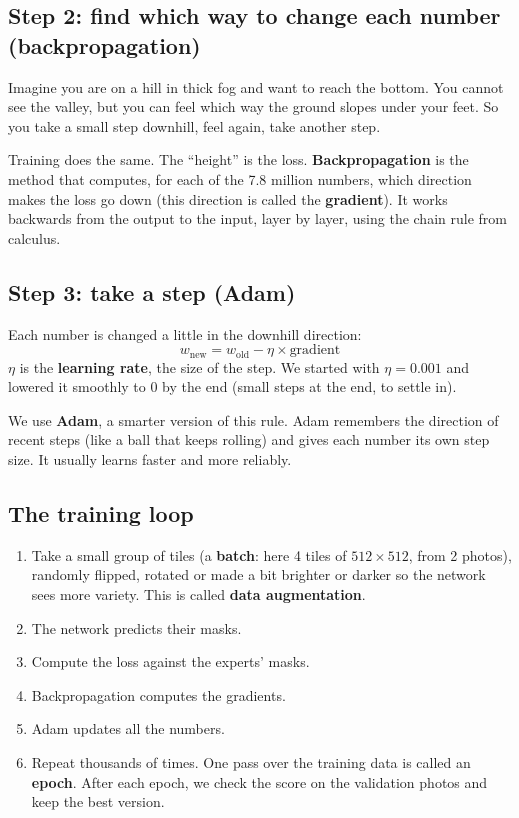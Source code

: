 \documentclass[11pt,a4paper]{article}
\begin{document}
\subsection{Step 2: find which way to change each number (backpropagation)}
Imagine you are on a hill in thick fog and want to reach the bottom. You cannot see the valley, but you can feel which way the ground slopes under your feet. So you take a small step downhill, feel again, take another step.

Training does the same. The ``height'' is the loss. \textbf{Backpropagation} is the method that computes, for each of the 7.8 million numbers, which direction makes the loss go down (this direction is called the \textbf{gradient}). It works backwards from the output to the input, layer by layer, using the chain rule from calculus.

\subsection{Step 3: take a step (Adam)}
Each number is changed a little in the downhill direction:
\[
w_{\text{new}} = w_{\text{old}} - \eta \times \text{gradient}
\]
$\eta$ is the \textbf{learning rate}, the size of the step. We started with $\eta = 0.001$ and lowered it smoothly to 0 by the end (small steps at the end, to settle in).

We use \textbf{Adam}, a smarter version of this rule. Adam remembers the direction of recent steps (like a ball that keeps rolling) and gives each number its own step size. It usually learns faster and more reliably.

\subsection{The training loop}
\begin{enumerate}
  \item Take a small group of tiles (a \textbf{batch}: here 4 tiles of $512\times512$, from 2 photos), randomly flipped, rotated or made a bit brighter or darker so the network sees more variety. This is called \textbf{data augmentation}.
  \item The network predicts their masks.
  \item Compute the loss against the experts' masks.
  \item Backpropagation computes the gradients.
  \item Adam updates all the numbers.
  \item Repeat thousands of times. One pass over the training data is called an \textbf{epoch}. After each epoch, we check the score on the validation photos and keep the best version.
\end{enumerate}
\end{document}
